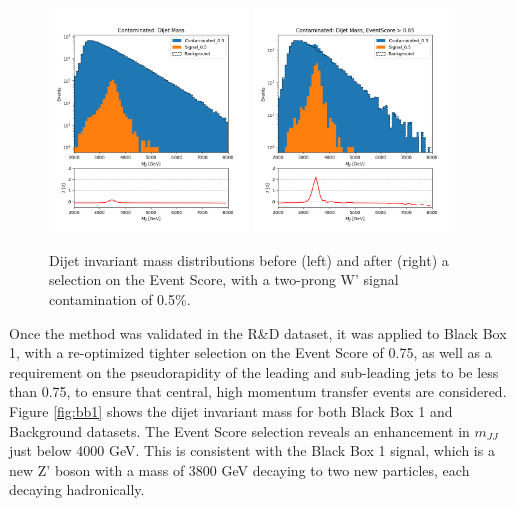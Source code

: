 \documentclass[letterpaper,11pt]{article}
\begin{document}
\begin{figure}[h!]
	\begin{center}
		\includegraphics[width=0.47\textwidth]{imgs/2Prong_Contaminated_0p5_JJ_Mass_Multi.png}
		\includegraphics[width=0.47\textwidth]{imgs/2Prong_Contaminated_0p5_JJ_Mass_EventScore0p65_Multi.png}
	\end{center}
	\caption{Dijet invariant mass distributions before (left) and after (right) a selection on the Event Score, with a two-prong W' signal contamination of 0.5\%.}
	\label{fig:m_JJ}
\end{figure}

Once the method was validated in the R\&D dataset, it was applied to Black Box 1, with a re-optimized tighter selection on the Event Score of 0.75, as well as a requirement on the pseudorapidity of the leading and sub-leading jets to be less than 0.75, to ensure that central, high momentum transfer events are considered. Figure {\ref{fig:bb1}} shows the dijet invariant mass for both Black Box 1 and Background datasets. The Event Score selection reveals an enhancement in $m_{JJ}$ just below 4000 GeV. This is consistent with the Black Box 1 signal, which is a new Z' boson with a mass of 3800 GeV decaying to two new particles, each decaying hadronically.
\end{document}

